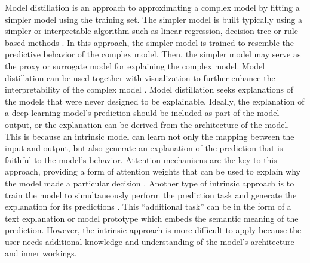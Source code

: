 \documentclass[preprint,12pt]{elsarticle}
\begin{document}
Model distillation is an approach to approximating a complex model by fitting a simpler model using the training set. The simpler model is built typically using a simpler or interpretable algorithm such as linear regression, decision tree or rule-based methods \citep{li_hybrid_2024}. In this approach, the simpler model is trained to resemble the predictive behavior of the complex model. Then, the simpler model may serve as the proxy or surrogate model for explaining the complex model. Model distillation can be used together with visualization to further enhance the interpretability of the complex model \citep{termritthikun_explainable_2023}. Model distillation seeks explanations of the models that were never designed to be explainable. Ideally, the explanation of a deep learning model’s prediction should be included as part of the model output, or the explanation can be derived from the architecture of the model. This is because an intrinsic model can learn not only the mapping between the input and output, but also generate an explanation of the prediction that is faithful to the model’s behavior. Attention mechanisms are the key to this approach, providing a form of attention weights that can be used to explain why the model made a particular decision \citep{xiong_explainable_2022}. Another type of intrinsic approach is to train the model to simultaneously perform the prediction task and generate the explanation for its predictions \citep{fernandes_intrinsic_2023}. This “additional task” can be in the form of a text explanation or model prototype which embeds the semantic meaning of the prediction. However, the intrinsic approach is more difficult to apply because the user needs additional knowledge and understanding of the model's architecture and inner workings.
\end{document}
